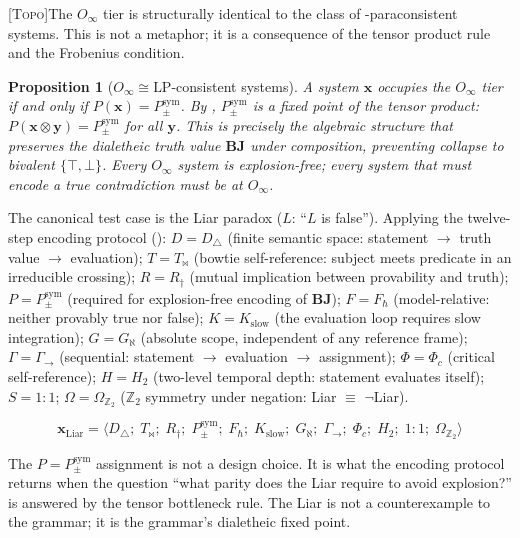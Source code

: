 \documentclass[12pt,a4paper]{article}
\newtheorem{proposition}[theorem]{Proposition}
\newcommand{\xvec}{\mathbf{x}}
\newcommand{\yvec}{\mathbf{y}}
\newcommand{\Phic}{\Phi_c}
\newcommand{\Ppms}{P_{\pm}^{\text{sym}}}
\newcommand{\Oinf}{O_\infty}
\newcommand{\tensor}{\otimes}
\newcommand{\OmegaZtwo}{\Omega_{\mathbb{Z}_2}}
\newcommand{\GamSeq}{\Gamma_{\to}}
\newcommand{\Tbw}{T_{\mathord{\bowtie}}}
\newcommand{\TOPO}{\textsc{[Topo]}}
\newcommand{\glp}{\text{LP}}
\newcommand{\both}{\mathbf{BJ}}
\begin{document}
\TOPO\quad The $\Oinf$ tier is structurally identical to the class
of \glp-paraconsistent systems. This is not a metaphor; it is a
consequence of the tensor product rule and the Frobenius condition.

\begin{proposition}[$\Oinf \cong \glp$-consistent systems]
\label{prop:lp_identity}
A system $\xvec$ occupies the $\Oinf$ tier if and only if $P(\xvec)
= \Ppms$. By , $\Ppms$ is a fixed point of the
tensor product: $P(\xvec \tensor \yvec) = \Ppms$ for all $\yvec$.
This is precisely the algebraic structure that preserves the
dialetheic truth value $\both$ under composition, preventing collapse
to bivalent $\{\top,\bot\}$.  Every $\Oinf$ system is explosion-free;
every system that must encode a true contradiction must be at $\Oinf$.
\end{proposition}

The canonical test case is the Liar paradox ($L$: ``$L$ is false'').
Applying the twelve-step encoding protocol ():
$D = D_\triangle$ (finite semantic space: statement $\to$ truth value
$\to$ evaluation); $T = \Tbw$ (bowtie self-reference: subject meets
predicate in an irreducible crossing); $R = R_\dagger$ (mutual implication
between provability and truth); $P = \Ppms$ (required for
explosion-free encoding of $\both$); $F = F_\hbar$ (model-relative:
neither provably true nor false); $K = K_\text{slow}$ (the evaluation
loop requires slow integration); $G = G_\aleph$ (absolute scope,
independent of any reference frame); $\Gamma = \GamSeq$ (sequential:
statement $\to$ evaluation $\to$ assignment); $\Phi = \Phic$ (critical
self-reference); $H = H_2$ (two-level temporal depth: statement
evaluates itself); $S = 1{:}1$; $\Omega = \OmegaZtwo$ ($\mathbb{Z}_2$
symmetry under negation: Liar $\equiv$ $\neg$Liar).

\begin{equation}
  \xvec_\text{Liar} = \langle D_\triangle;\; \Tbw;\; R_\dagger;\; \Ppms;\;
  F_\hbar;\; K_\text{slow};\; G_\aleph;\; \GamSeq;\; \Phic;\; H_2;\;
  1{:}1;\; \OmegaZtwo \rangle
  \label{eq:liar_encoding}
\end{equation}

\noindent
The $P = \Ppms$ assignment is not a design choice. It is what the encoding
protocol returns when the question ``what parity does the Liar require to
avoid explosion?'' is answered by the tensor bottleneck rule. The Liar is not
a counterexample to the grammar; it is the grammar's dialetheic fixed point.
\end{document}
